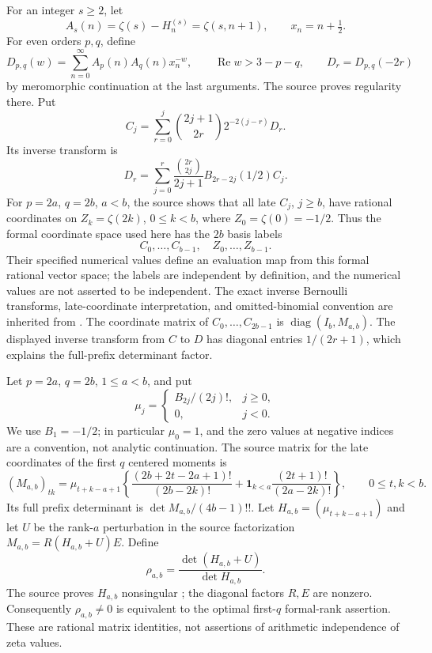 \documentclass[11pt,a4paper]{article}
\numberwithin{equation}{section}
\theoremstyle{definition}
\theoremstyle{remark}
\begin{document}
For an integer $s\ge2$, let
\[
 A_s(n)=\zeta(s)-H_n^{(s)}=\zeta(s,n+1),\qquad x_n=n+\tfrac12.
\]
For even orders $p,q$, define
\[
 D_{p,q}(w)=\sum_{n=0}^{\infty}A_p(n)A_q(n)x_n^{-w},
 \qquad \operatorname{Re}w>3-p-q,
 \qquad D_r=D_{p,q}(-2r)
\]
by meromorphic continuation at the last arguments. The source proves
regularity there. Put
\[
 C_j=\sum_{r=0}^j\binom{2j+1}{2r}2^{-2(j-r)}D_r.
\]
Its inverse transform is
\[
 D_r=\sum_{j=0}^r\frac{\binom{2r}{2j}}{2j+1}
                  B_{2r-2j}(1/2)C_j.
\]
For $p=2a$, $q=2b$, $a<b$, the source shows that all late $C_j$,
$j\ge b$, have rational coordinates on
$Z_k=\zeta(2k)$, $0\le k<b$, where $Z_0=\zeta(0)=-1/2$.
Thus the formal coordinate space used here has the $2b$ basis labels
\[
 C_0,\ldots,C_{b-1},\quad Z_0,\ldots,Z_{b-1}.
\]
Their specified numerical values define an evaluation map from this
formal rational vector space; the labels are independent by definition,
and the numerical values are not asserted to be independent.
The exact inverse Bernoulli transforms, late-coordinate interpretation,
and omitted-binomial convention are inherited from \cite{BTDsource,PRR}.
The coordinate matrix of $C_0,\ldots,C_{2b-1}$ is
$\operatorname{diag}(I_b,M_{a,b})$. The displayed inverse transform
from $C$ to $D$ has diagonal entries $1/(2r+1)$, which explains
the full-prefix determinant factor.

Let $p=2a$, $q=2b$, $1\le a<b$, and put
\[
 \mu_j=\begin{cases}B_{2j}/(2j)!,&j\ge0,\\0,&j<0.\end{cases}
\]
We use $B_1=-1/2$; in particular $\mu_0=1$, and the zero values at negative indices are a convention, not analytic continuation.
The source matrix for the late coordinates of the first $q$ centered
moments is
\[
 (M_{a,b})_{tk}=\mu_{t+k-a+1}
 \left\{\frac{(2b+2t-2a+1)!}{(2b-2k)!}
  +\mathbf1_{k<a}\frac{(2t+1)!}{(2a-2k)!}\right\},
 \qquad 0\le t,k<b.
\]
Its full prefix determinant is $\det M_{a,b}/(4b-1)!!$. Let
$H_{a,b}=(\mu_{t+k-a+1})$ and let $U$ be the rank-$a$ perturbation
in the source factorization $M_{a,b}=R(H_{a,b}+U)E$. Define
\[
 \rho_{a,b}=\frac{\det(H_{a,b}+U)}{\det H_{a,b}}.
\]
The source proves $H_{a,b}$ nonsingular \cite{BTDsource}; the diagonal factors $R,E$
are nonzero. Consequently $\rho_{a,b}\ne0$ is equivalent to the
optimal first-$q$ formal-rank assertion. These are rational matrix
identities, not assertions of arithmetic independence of zeta values.
\end{document}
